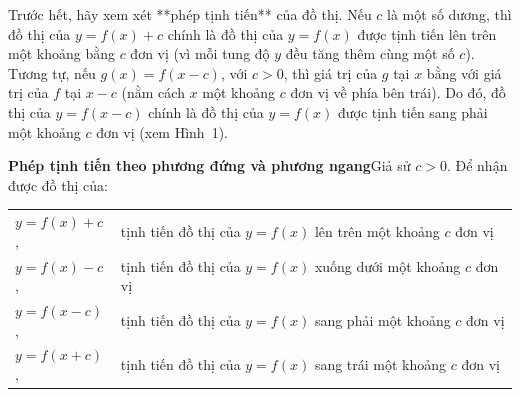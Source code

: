 \begin{minipage}[t]{0.708\textwidth}
    \fontsize{9.3pt}{13.2pt}\selectfont
    Trước hết, hãy xem xét **phép tịnh tiến** của đồ thị. Nếu $c$ là một số dương, thì đồ thị của $y = f(x) + c$ chính là đồ thị của $y = f(x)$ được tịnh tiến lên trên một khoảng bằng $c$ đơn vị (vì mỗi tung độ $y$ đều tăng thêm cùng một số $c$). Tương tự, nếu $g(x) = f(x - c)$, với $c > 0$, thì giá trị của $g$ tại $x$ bằng với giá trị của $f$ tại $x - c$ (nằm cách $x$ một khoảng $c$ đơn vị về phía bên trái). Do đó, đồ thị của $y = f(x - c)$ chính là đồ thị của $y = f(x)$ được tịnh tiến sang phải một khoảng $c$ đơn vị (xem Hình~1).

    \begin{definitionbox}
        \textbf{\textsf{\color{stewartred}Phép tịnh tiến theo phương đứng và phương ngang}}\quad Giả sử $c > 0$. Để nhận được đồ thị của:
        \vspace{4pt}

        \noindent
        \begin{tabular}{@{}ll@{}}
        $y = f(x) + c$, & tịnh tiến đồ thị của $y = f(x)$ lên trên một khoảng $c$ đơn vị \\
        $y = f(x) - c$, & tịnh tiến đồ thị của $y = f(x)$ xuống dưới một khoảng $c$ đơn vị \\
        $y = f(x - c)$, & tịnh tiến đồ thị của $y = f(x)$ sang phải một khoảng $c$ đơn vị \\
        $y = f(x + c)$, & tịnh tiến đồ thị của $y = f(x)$ sang trái một khoảng $c$ đơn vị
        \end{tabular}
    \end{definitionbox}

    \begin{center}
\end{center}
\end{minipage}
